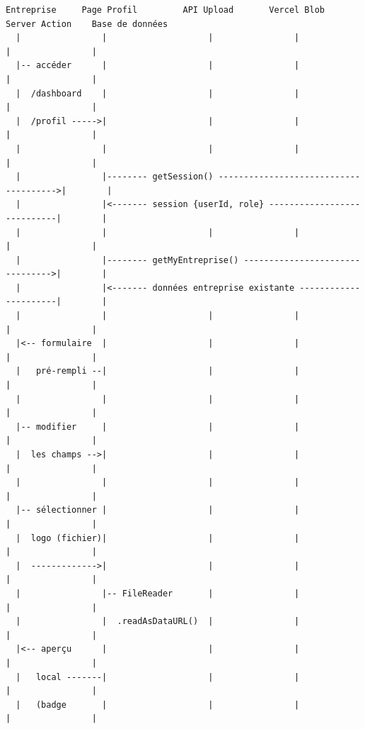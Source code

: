 \documentclass[12pt,a4paper]{article}
\begin{document}
\begin{tcolorbox}[colback=white,colframe=black!50,title=DS-02 — Mise à jour profil avec upload d'images]
\small
\begin{verbatim}
Entreprise     Page Profil         API Upload       Vercel Blob     Server Action    Base de données
  |                |                    |                |                |                |
  |-- accéder      |                    |                |                |                |
  |  /dashboard    |                    |                |                |                |
  |  /profil ----->|                    |                |                |                |
  |                |                    |                |                |                |
  |                |-------- getSession() -------------------------------------->|        |
  |                |<------- session {userId, role} ----------------------------|        |
  |                |                    |                |                |                |
  |                |-------- getMyEntreprise() -------------------------------->|        |
  |                |<------- données entreprise existante ----------------------|        |
  |                |                    |                |                |                |
  |<-- formulaire  |                    |                |                |                |
  |   pré-rempli --|                    |                |                |                |
  |                |                    |                |                |                |
  |-- modifier     |                    |                |                |                |
  |  les champs -->|                    |                |                |                |
  |                |                    |                |                |                |
  |-- sélectionner |                    |                |                |                |
  |  logo (fichier)|                    |                |                |                |
  |  ------------->|                    |                |                |                |
  |                |-- FileReader       |                |                |                |
  |                |  .readAsDataURL()  |                |                |                |
  |<-- aperçu      |                    |                |                |                |
  |   local -------|                    |                |                |                |
  |   (badge       |                    |                |                |                |

\end{verbatim}
\end{tcolorbox}
\end{document}
